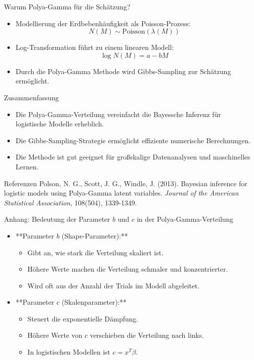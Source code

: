 \documentclass{beamer}
\begin{document}
	
	\begin{frame}{Warum Polya-Gamma für die Schätzung?}
		\begin{itemize}
			\item Modellierung der Erdbebenhäufigkeit als Poisson-Prozess:
			\[ N(M) \sim \text{Poisson}(\lambda(M)) \]
			\item Log-Transformation führt zu einem linearen Modell:
			\[ \log N(M) = a - bM \]
			\item Durch die Polya-Gamma Methode wird Gibbs-Sampling zur Schätzung ermöglicht.
		\end{itemize}
	\end{frame}
	
	
	
	
	\begin{frame}{Zusammenfassung}
		\begin{itemize}
			\item Die Polya-Gamma-Verteilung vereinfacht die Bayessche Inferenz für logistische Modelle erheblich.
			\item Die Gibbs-Sampling-Strategie ermöglicht effiziente numerische Berechnungen.
			\item Die Methode ist gut geeignet für großskalige Datenanalysen und maschinelles Lernen.
		\end{itemize}
	\end{frame}
	




	\begin{frame}{Referenzen}
		Polson, N. G., Scott, J. G.,  Windle, J. (2013). Bayesian inference for logistic models using Polya-Gamma latent variables. \textit{Journal of the American Statistical Association}, 108(504), 1339-1349.
	\end{frame}


\begin{frame}{Anhang: Bedeutung der Parameter $b$ und $c$ in der Polya-Gamma-Verteilung}
	\begin{itemize}
		\item **Parameter $b$ (Shape-Parameter):**
		\begin{itemize}
			\item Gibt an, wie stark die Verteilung skaliert ist.
			\item Höhere Werte machen die Verteilung schmaler und konzentrierter.
			\item Wird oft aus der Anzahl der Trials im Modell abgeleitet.
		\end{itemize}
		\item **Parameter $c$ (Skalenparameter):**
		\begin{itemize}
			\item Steuert die exponentielle Dämpfung.
			\item Höhere Werte von $c$ verschieben die Verteilung nach links.
			\item In logistischen Modellen ist $c = x^T \beta$.
		\end{itemize}
	\end{itemize}
\end{frame}
\end{document}
